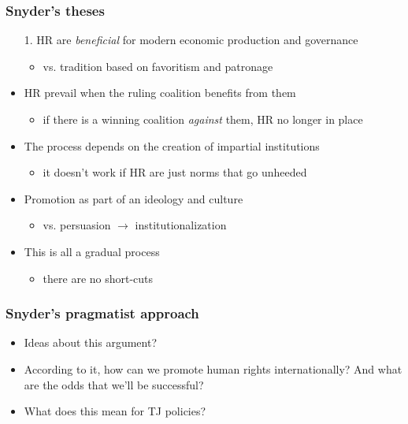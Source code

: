 \documentclass[aspectratio=43]{beamer}
\begin{document}
\begin{frame}
\frametitle{Snyder's theses}
\centering

\begin{itemize}
  \item[1.] HR are \textit{beneficial} for modern economic production and governance
  \begin{itemize}
    \item vs. tradition based on favoritism and patronage
  \end{itemize}
  \item<2->[2.] HR prevail when the ruling coalition benefits from them
  \begin{itemize}
    \item if there is a winning coalition \textit{against} them, HR no longer in place
  \end{itemize}
  \item<3->[3.] The process depends on the creation of impartial institutions
  \begin{itemize}
    \item it doesn't work if HR are just norms that go unheeded
  \end{itemize}
  \item<4->[4.] Promotion as part of an ideology and culture
  \begin{itemize}
    \item vs. persuasion $\rightarrow$ institutionalization
  \end{itemize}
  \item<5->[5.] This is all a gradual process
  \begin{itemize}
    \item there are no short-cuts
  \end{itemize}
\end{itemize}

\end{frame}

\begin{frame}
\frametitle{Snyder's pragmatist approach}
\centering

\begin{itemize}
  \item Ideas about this argument?
  \item According to it, how can we promote human rights internationally? And what are the odds that we'll be successful?
  \item<2-> What does this mean for TJ policies?
\end{itemize}

\end{frame}
\end{document}
